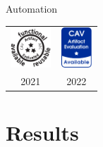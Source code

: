 \documentclass[
11pt,
usepdftitle=false,
aspectratio=169,
xcolor={table,usenames,dvipsnames},
handout,
]{beamer}
\begin{document}
\begin{frame}[fragile]{Automation}
\begin{center}
\begin{tabular}{c@{\qquad}c}
  \includegraphics[height=1.5cm,width=1.5cm]{aec-badge_f_a_r.pdf}
  &
  \includegraphics[height=1.5cm,width=1.2cm]{1-available.pdf}
  \\
2021 &
2022
\end{tabular}
\end{center}
\end{frame}

\section{Results}
\end{document}
